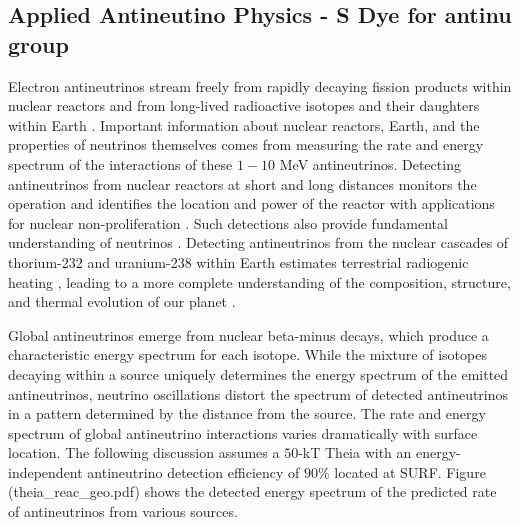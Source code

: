 \subsection{Applied Antineutino Physics - S Dye for antinu group}
Electron antineutrinos stream freely from rapidly decaying fission products within nuclear reactors and from long-lived radioactive isotopes and their daughters within Earth \cite{agm15}. Important information about nuclear reactors, Earth, and the properties of neutrinos themselves comes from measuring the rate and energy spectrum of the interactions of these $1-10$ MeV antineutrinos. Detecting antineutrinos from nuclear reactors at short \cite{nucifer15,songs07} and long \cite{nudar13,snif10} distances monitors the operation and identifies the location and power of the reactor with applications for nuclear non-proliferation \cite{adam10}. Such detections also provide fundamental understanding of neutrinos \cite{reines53,reines76,jgl08}. Detecting antineutrinos from the nuclear cascades of thorium-232 and uranium-238 within Earth \cite{kl05} estimates terrestrial radiogenic heating \cite{gando13,agostini15}, leading to a more complete understanding of the composition, structure, and thermal evolution of our planet \cite{dye_etal15}. 

Global antineutrinos emerge from nuclear beta-minus decays, which produce a characteristic energy spectrum for each isotope. While the mixture of isotopes decaying within a source uniquely determines the energy spectrum of the emitted antineutrinos, neutrino oscillations distort the spectrum of detected antineutrinos in a pattern determined by the distance from the source. The rate and energy spectrum of global antineutrino interactions varies dramatically with surface location. The following discussion assumes a $50$-kT Theia with an energy-independent antineutrino detection efficiency of $90$\% located at SURF. Figure (theia_reac_geo.pdf) shows the detected energy spectrum of the predicted rate of antineutrinos from various sources.

